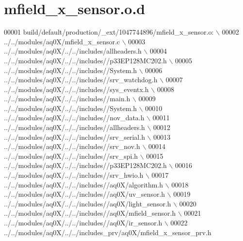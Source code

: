 \hypertarget{a00051_source}{\section{mfield\+\_\+x\+\_\+sensor.\+o.\+d}
\label{a00051_source}
}

\begin{DoxyCode}
00001 build/\textcolor{keywordflow}{default}/production/\_ext/1047744896/mfield\_x\_sensor.o:  \(\backslash\)
00002  ../../modules/aq0X/mfield\_x\_sensor.c  \(\backslash\)
00003 ../../modules/aq0X/../../includes/allheaders.h  \(\backslash\)
00004 ../../modules/aq0X/../../includes\textcolor{comment}{//p33EP128MC202.h  \(\backslash\)}
00005 \textcolor{comment}{../../modules/aq0X/../../includes//System.h  \(\backslash\)}
00006 \textcolor{comment}{../../modules/aq0X/../../includes//srv\_watchdog.h  \(\backslash\)}
00007 \textcolor{comment}{../../modules/aq0X/../../includes//sys\_eventx.h  \(\backslash\)}
00008 \textcolor{comment}{../../modules/aq0X/../../includes//main.h  \(\backslash\)}
00009 \textcolor{comment}{../../modules/aq0X/../../includes//System.h  \(\backslash\)}
00010 \textcolor{comment}{../../modules/aq0X/../../includes//nov\_data.h  \(\backslash\)}
00011 \textcolor{comment}{../../modules/aq0X/../../includes//allheaders.h  \(\backslash\)}
00012 \textcolor{comment}{../../modules/aq0X/../../includes//srv\_serial.h  \(\backslash\)}
00013 \textcolor{comment}{../../modules/aq0X/../../includes//srv\_nov.h  \(\backslash\)}
00014 \textcolor{comment}{../../modules/aq0X/../../includes//srv\_spi.h  \(\backslash\)}
00015 \textcolor{comment}{../../modules/aq0X/../../includes//p33EP128MC202.h  \(\backslash\)}
00016 \textcolor{comment}{../../modules/aq0X/../../includes//srv\_hwio.h  \(\backslash\)}
00017 \textcolor{comment}{../../modules/aq0X/../../includes//aq0X/algorithm.h  \(\backslash\)}
00018 \textcolor{comment}{../../modules/aq0X/../../includes//aq0X/uv\_sensor.h  \(\backslash\)}
00019 \textcolor{comment}{../../modules/aq0X/../../includes//aq0X/light\_sensor.h  \(\backslash\)}
00020 \textcolor{comment}{../../modules/aq0X/../../includes//aq0X/mfield\_sensor.h  \(\backslash\)}
00021 \textcolor{comment}{../../modules/aq0X/../../includes//aq0X/ir\_sensor.h  \(\backslash\)}
00022 \textcolor{comment}{../../modules/aq0X/../../includes\_prv/aq0X/mfield\_x\_sensor\_prv.h }
\end{DoxyCode}
